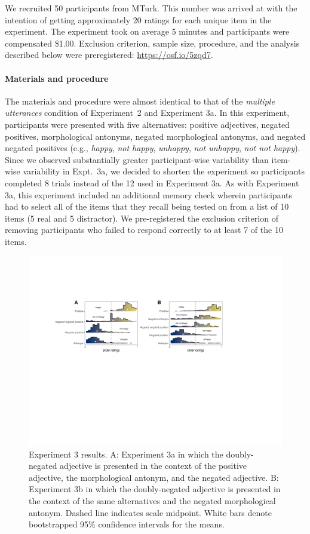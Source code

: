 \documentclass[floatsintext,doc]{apa6}
\let\oldparagraph\paragraph
\renewcommand{\paragraph}[1]{\oldparagraph{#1}\mbox{}}
\begin{document}
We recruited 50 participants from MTurk. 
This number was arrived at with the intention of getting approximately 20 ratings for each unique item in the experiment.
The experiment took on average 5 minutes and participants were compensated \$1.00.
Exclusion criterion, sample size, procedure, and the analysis described below were preregistered: \url{https://osf.io/5zqd7}.

\paragraph{Materials and procedure}\label{materials-3}

The materials and procedure were almost identical to that of the \emph{multiple utterances} condition of Experiment~2 and Experiment 3a.
In this experiment, participants were presented with five  alternatives: positive adjectives, negated positives, morphological antonyms, negated morphological antonyms, and negated negated positives (e.g., \emph{happy}, \emph{not happy}, \emph{unhappy}, \emph{not unhappy}, \emph{not not happy}).
Since we observed substantially greater participant-wise variability than item-wise variability in Expt.~3a, we decided to shorten the experiment so participants completed 8 trials instead of the 12 used in Experiment 3a.
As with Experiment 3a, this experiment included an additional memory check wherein participants had to select all of the items that they recall being tested on from a list of 10 items (5 real and 5 distractor). 
We pre-registered the exclusion criterion of removing participants who failed to respond correctly to at least 7 of the 10 items. 

\begin{figure}[h]
\centering \includegraphics[width=\linewidth]{figs/expt3_directlabel_hist_ab} 
\caption{Experiment 3 results. A: Experiment 3a in which the doubly-negated adjective is presented in the context of the positive adjective, the morphological antonym, and the negated adjective. B: Experiment 3b in which the doubly-negated adjective is presented in the context of the same alternatives and the negated morphological antonym. Dashed line indicates scale midpoint. White bars denote bootstrapped 95\% confidence intervals for the means.}\label{fig:expt3-results}
\end{figure}
\end{document}
